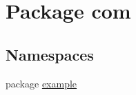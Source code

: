 \hypertarget{namespacecom}{\section{Package com}
\label{namespacecom}
}
\subsection*{Namespaces}
\begin{DoxyCompactItemize}
\item 
package \hyperlink{namespacecom_1_1example}{example}
\end{DoxyCompactItemize}

